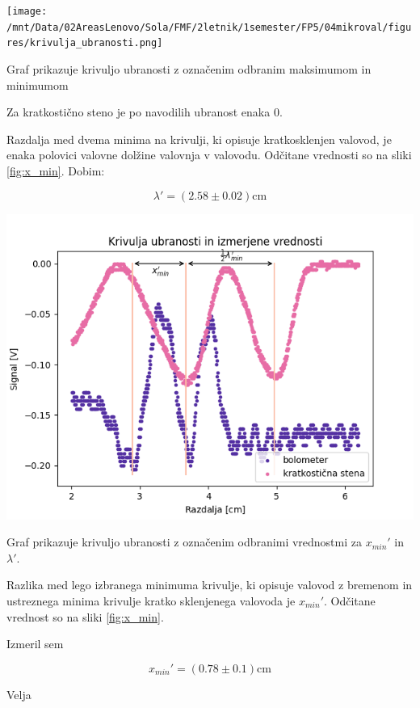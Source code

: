 \documentclass[11pt]{article}
\begin{document}
\begin{slika}[H]
\begin{center}
\texttt{[image: /mnt/Data/02AreasLenovo/Sola/FMF/2letnik/1semester/FP5/04mikroval/figures/krivulja\_ubranosti.png]}
\end{center}
\caption{\small Graf prikazuje krivuljo ubranosti z označenim odbranim maksimumom
in minimumom}\label{fig:krivulja_ubranosti}
\end{slika}

Za kratkostično steno je po navodilih ubranost enaka 0.

Razdalja med dvema minima na krivulji, ki opisuje kratkosklenjen valovod,
je enaka polovici valovne dolžine valovnja v valovodu. Odčitane vrednosti so
na sliki \ref{fig:x_min}. Dobim:

\[ \lambda' = (2.58 \pm 0.02) \mathrm{cm}
\]

\begin{slika}[H]
\begin{center}
\includegraphics[width=.9\linewidth]{figures/krivulja_ubranosti_x_min}
\end{center}
\caption{\small Graf prikazuje krivuljo ubranosti z označenim odbranimi vrednostmi
  za \(x_{min}'\) in \( \lambda'\).}\label{fig:x_min}
\end{slika}


Razlika med lego izbranega minimuma krivulje, ki opisuje valovod z bremenom
in ustreznega minima krivulje kratko sklenjenega valovoda je \(x_{min}'\).
Odčitane vrednost so na sliki \ref{fig:x_min}.

Izmeril sem

\[ x_{min}' = (0.78 \pm 0.1) \mathrm{cm}
\]

Velja
\end{document}
